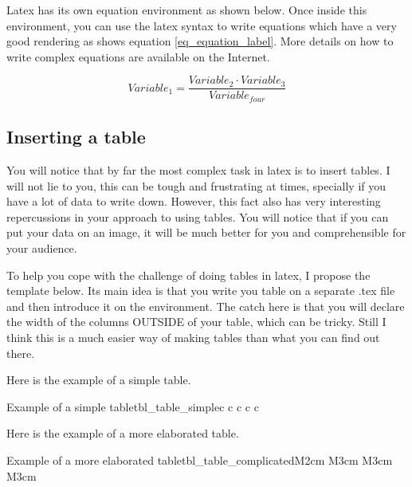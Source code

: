 	Latex has its own equation environment as shown below. 
	Once inside this environment, you can use the latex syntax to write equations which have a very good rendering as shows equation \ref{eq_equation_label}.
	More details on how to write complex equations are available on the Internet. 
	
	\begin{equation}
		Variable_{1} = \dfrac{Variable_{2} \cdot Variable_{3}}{Variable_{four}}   
		\label{eq_equation_label}
	\end{equation}
	
	
	\subsection{Inserting a table}
	
	You will notice that by far the most complex task in latex is to insert tables. 
	I will not lie to you, this can be tough and frustrating at times, specially if you have a lot of data to write down.
	However, this fact also has very interesting repercussions in your approach to using tables.
	You will notice that if you can put your data on an image, it will be much better for you and comprehensible for your audience.
	
	To help you cope with the challenge of doing tables in latex, I propose the template below. 
	Its main idea is that you write you table on a separate .tex file and then introduce it on the  environment. 
	The catch here is that you will declare the width of the columns OUTSIDE of your table, which can be tricky. 
	Still I think this is a much easier way of making tables than what you can find out there. 
	
	Here is the example of a simple table.


	\begin{mytable}{Example of a simple table}{tbl_table_simple}{c c c c c}
	\end{mytable}
	
	Here is the example of a more elaborated table.
	
	\begin{mytable}{Example of a more elaborated table}{tbl_table_complicated}{M{2cm} M{3cm} M{3cm} M{3cm}}
	\end{mytable}
	
